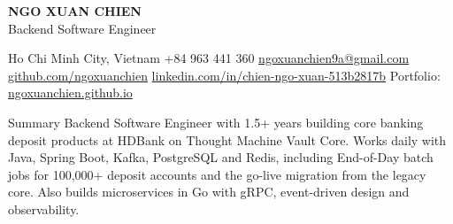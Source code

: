 \documentclass{resume} %
\begin{document}
\raggedright %


{\centering
    {\huge\bf NGO XUAN CHIEN} \\[8pt]
    {\large Backend Software Engineer} \\[6pt]
    {\small
        Ho Chi Minh City, Vietnam \textbar{} +84 963 441 360 \textbar{} \href{mailto:ngoxuanchien9a@gmail.com}{ngoxuanchien9a@gmail.com} \\[2pt]
        \href{https://github.com/ngoxuanchien}{github.com/ngoxuanchien} \textbar{} \href{https://www.linkedin.com/in/chien-ngo-xuan-513b2817b/}{linkedin.com/in/chien-ngo-xuan-513b2817b} \textbar{} Portfolio: \href{https://ngoxuanchien.github.io}{ngoxuanchien.github.io}
    \par}
\par}


\begin{rSection}{Summary}
    Backend Software Engineer with 1.5+ years building core banking deposit products at HDBank on Thought Machine Vault Core. Works daily with Java, Spring Boot, Kafka, PostgreSQL and Redis, including End-of-Day batch jobs for 100,000+ deposit accounts and the go-live migration from the legacy core. Also builds microservices in Go with gRPC, event-driven design and observability.
\end{rSection}
\end{document}
